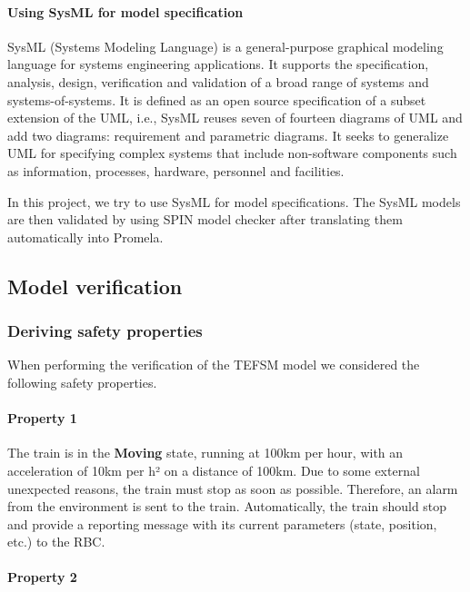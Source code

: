 \documentclass{template/openetcs_article}
\begin{document}
\paragraph{Using SysML for model specification}

SysML (Systems Modeling Language) is a general-purpose graphical modeling language for systems engineering applications. It supports the specification, analysis, design, verification and validation of a broad range of systems and systems-of-systems. It is defined as an open source specification of a subset extension of the UML, i.e., SysML reuses seven of fourteen diagrams of UML and add two diagrams: requirement and parametric diagrams. It seeks to generalize UML for specifying complex systems that include non-software components such as information, processes, hardware, personnel and facilities.

In this project, we try to use SysML for model specifications. The SysML models are then validated by using SPIN model checker after translating them automatically into Promela.

\subsection{Model verification}\label{sec3}


\subsubsection{Deriving safety properties}\label{subsec3.1}


When performing the verification of the TEFSM model we considered the following safety properties.

\paragraph*{Property 1}

The train is in the \textbf{Moving} state, running at 100km per hour, with an acceleration of 10km per h² on a distance of 100km. Due to some external unexpected reasons, the train must stop as soon as possible. Therefore, an alarm from the environment is sent to the train. Automatically, the train should stop and provide a reporting message with its current parameters (state, position, etc.) to the RBC.

\paragraph*{Property 2}
\end{document}
